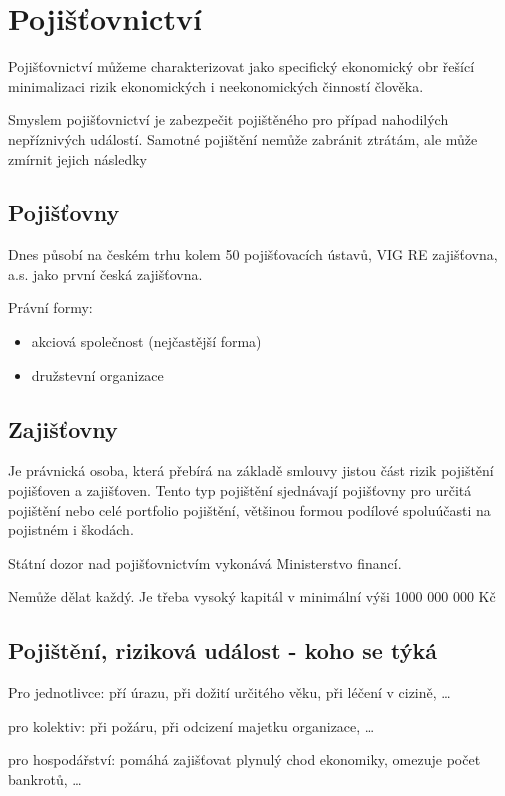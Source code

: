\section*{Pojišťovnictví}

Pojišťovnictví můžeme charakterizovat jako specifický ekonomický obr řešící minimalizaci rizik ekonomických i neekonomických činností člověka.

Smyslem pojišťovnictví je zabezpečit pojištěného pro případ nahodilých nepříznivých událostí. Samotné pojištění nemůže zabránit ztrátám, ale může zmírnit jejich následky

\subsection*{Pojišťovny}

Dnes působí na českém trhu kolem 50 pojišťovacích ústavů, VIG RE zajišťovna, a.s. jako první česká zajišťovna.

Právní formy:
\begin{itemize}
    \item akciová společnost (nejčastější forma)
    \item družstevní organizace
\end{itemize}

\subsection*{Zajišťovny}

Je právnická osoba, která přebírá na základě smlouvy jistou část rizik pojištění pojišťoven a zajišťoven. Tento typ pojištění sjednávají pojišťovny pro určitá pojištění nebo celé portfolio pojištění, většinou formou podílové spoluúčasti na pojistném i škodách.

Státní dozor nad pojišťovnictvím vykonává Ministerstvo financí.

Nemůže dělat každý. Je třeba vysoký kapitál v minimální výši 1000 000 000 Kč

\subsection*{Pojištění, riziková událost - koho se týká}

Pro jednotlivce: pří úrazu, při dožití určitého věku, při léčení v cizině, \ldots

pro kolektiv: při požáru, při odcizení majetku organizace, \ldots

pro hospodářství: pomáhá zajišťovat plynulý chod ekonomiky, omezuje počet bankrotů, \ldots

